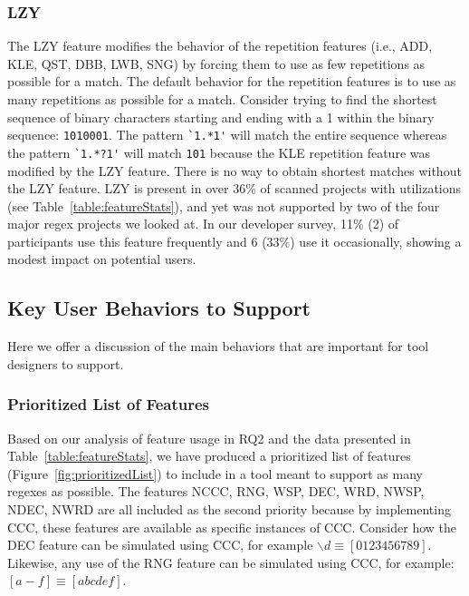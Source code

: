 \subsubsection{LZY}
The LZY feature modifies the behavior of the repetition features (i.e., ADD, KLE, QST, DBB, LWB, SNG) by forcing them to use as few repetitions as possible for a match.  The default behavior for the repetition features is to use as many repetitions as possible for a match.  Consider trying to find the shortest sequence of binary characters starting and ending with a 1 within the binary sequence: {\tt 1010001}. The pattern \verb!`1.*1'! will match the entire sequence whereas the pattern \verb!`1.*?1'! will match {\tt 101} because the KLE repetition feature was modified by the LZY feature.  There is no way to obtain shortest matches without the LZY feature.  LZY is present in over 36\% of scanned projects with utilizations (see Table~\ref{table:featureStats}), and yet was not supported by two of the four major regex projects we looked at.
In our developer survey, 11\% (2) of participants use this feature frequently and 6 (33\%) use it occasionally, showing a modest impact on potential users.

\subsection{Key User Behaviors to Support}
Here we offer a discussion of the main behaviors that are important for tool designers to support.

\subsubsection{Prioritized List of Features}
\label{sec:prioritizedList}
Based on our analysis of feature usage in RQ2 and the data presented in Table~\ref{table:featureStats}, we have produced a prioritized list of features (Figure~\ref{fig:prioritizedList}) to include in a tool meant to support as many regexes as possible. The features NCCC, RNG, WSP, DEC, WRD, NWSP, NDEC, NWRD are all included as the second priority because by implementing CCC, these features are available as specific instances of CCC.  Consider how the DEC feature can be simulated using CCC, for example  $\backslash d \equiv [0123456789]$. Likewise, any use of the RNG feature can be simulated using CCC, for example: $[a-f] \equiv [abcdef]$.

